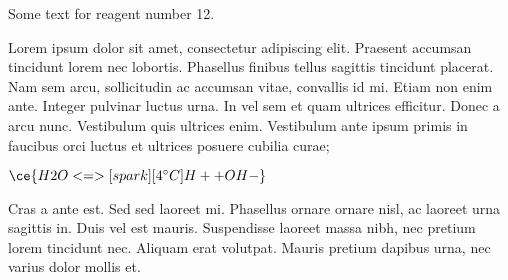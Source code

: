 
Some text for reagent number 12.

Lorem ipsum dolor sit amet, consectetur adipiscing elit. Praesent accumsan tincidunt lorem nec lobortis. Phasellus finibus tellus sagittis tincidunt placerat. Nam sem arcu, sollicitudin ac accumsan vitae, convallis id mi. Etiam non enim ante. Integer pulvinar luctus urna. In vel sem et quam ultrices efficitur. Donec a arcu nunc. Vestibulum quis ultrices enim. Vestibulum ante ipsum primis in faucibus orci luctus et ultrices posuere cubilia curae;

$\ce{H2O <=>[spark][4^\circ C] H+ + OH-}$

Cras a ante est. Sed sed laoreet mi. Phasellus ornare ornare nisl, ac laoreet urna sagittis in. Duis vel est mauris. Suspendisse laoreet massa nibh, nec pretium lorem tincidunt nec. Aliquam erat volutpat. Mauris pretium dapibus urna, nec varius dolor mollis et.
